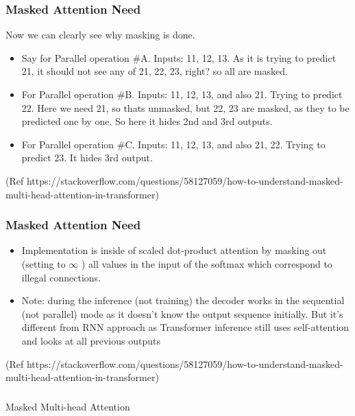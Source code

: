 \begin{frame}[fragile]\frametitle{Masked Attention Need}

Now we can clearly see why masking is done.

\begin{itemize}
  \item  Say for Parallel operation \#A. Inputs: 11, 12, 13. As it is trying to predict 21, it should not see any of 21, 22, 23, right? so all are masked.
  \item For Parallel operation \#B. Inputs: 11, 12, 13, and also 21. Trying to predict 22. Here we need 21, so thats unmasked, but 22, 23 are masked, as they to be predicted one by one. So here it hides  2nd and 3rd outputs.
	\item For Parallel operation \#C. Inputs: 11, 12, 13, and also 21, 22. Trying to predict 23. It hides 3rd output.
\end{itemize}

{\tiny (Ref https://stackoverflow.com/questions/58127059/how-to-understand-masked-multi-head-attention-in-transformer)}

\end{frame}

\begin{frame}[fragile]\frametitle{Masked Attention Need}


\begin{itemize}
  \item   Implementation is inside of scaled dot-product attention by masking out (setting to $\infty$ ) all values in the input of the softmax which correspond to illegal connections.
  \item Note: during the inference (not training) the decoder works in the sequential (not parallel) mode as it doesn't know the output sequence initially. But it's different from RNN approach as Transformer inference still uses self-attention and looks at all previous outputs
\end{itemize}

{\tiny (Ref https://stackoverflow.com/questions/58127059/how-to-understand-masked-multi-head-attention-in-transformer)}

\end{frame}

\begin{frame}[fragile]\frametitle{}
\begin{center}
{\Large Masked Multi-head Attention}
\end{center}
\end{frame}


